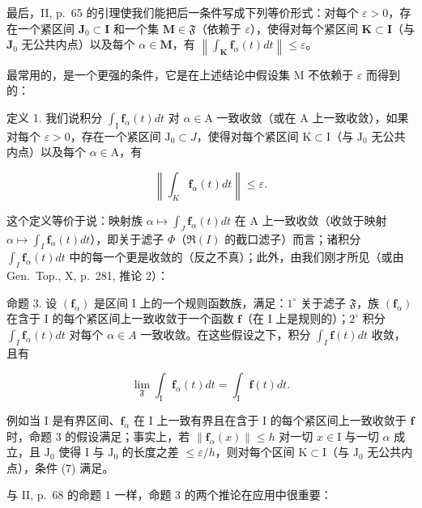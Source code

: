 最后，II, p.~65 的引理使我们能把后一条件写成下列等价形式：对每个 \(\varepsilon > 0\)，存在一个紧区间 \(\mathbf{J}_0 \subset \mathbf{I}\) 和一个集 \(\mathbf{M} \in \mathfrak{F}\)（依赖于 \(\varepsilon\)），使得对每个紧区间 \(\mathbf{K} \subset \mathbf{I}\)（与 \(\mathbf{J}_0\) 无公共内点）以及每个 \(\alpha \in \mathbf{M}\)，有 \(\left\| \int_{\mathbf{K}} \mathbf{f}_{\alpha}(t) dt \right\| \leqslant \varepsilon\)。

最常用的，是一个更强的条件，它是在上述结论中假设集 M 不依赖于 \(\varepsilon\) 而得到的：

定义 1. 我们说积分 \(\int_{\mathrm{I}} \mathbf{f}_{\alpha}(t) dt\) 对 \(\alpha \in \mathrm{A}\) 一致收敛（或在 \(\mathrm{A}\) 上一致收敛），如果对每个 \(\varepsilon > 0\)，存在一个紧区间 \(\mathrm{J}_0 \subset J\)，使得对每个紧区间 \(\mathrm{K} \subset \mathrm{I}\)（与 \(\mathrm{J}_0\) 无公共内点）以及每个 \(\alpha \in \mathrm{A}\)，有

\[
\left\| \int_ {K} \mathbf {f} _ {\alpha} (t) d t \right\| \leqslant \varepsilon .\tag{7}
\]

这个定义等价于说：映射族 \(\alpha\mapsto\int_{J}\mathbf{f}_{\alpha}(t)dt\) 在 A 上一致收敛（收敛于映射 \(\alpha\mapsto\int_{I}\mathbf{f}_{\alpha}(t)dt\)），即关于滤子 \(\Phi\)（\(\Re(I)\) 的截口滤子）而言；诸积分 \(\int_{I}\mathbf{f}_{\alpha}(t)dt\) 中的每一个更是收敛的（反之不真）；此外，由我们刚才所见（或由 Gen.~Top., X, p.~281, 推论 2）：

命题 3. 设 \((\mathbf{f}_{\alpha})\) 是区间 I 上的一个规则函数族，满足：\(1^{\circ}\) 关于滤子 \(\mathfrak{F}\)，族 \((\mathbf{f}_{\alpha})\) 在含于 I 的每个紧区间上一致收敛于一个函数 \(\mathbf{f}\)（在 I 上是规则的）；\(2^{\circ}\) 积分 \(\int_{I} \mathbf{f}_{\alpha}(t) dt\) 对每个 \(\alpha \in A\) 一致收敛。在这些假设之下，积分 \(\int_{I} \mathbf{f}(t) dt\) 收敛，且有

\[
\lim _ {\mathfrak {F}} \int_ {\mathrm{I}} \mathbf {f} _ {\alpha} (t) d t = \int_ {\mathrm{I}} \mathbf {f} (t) d t.\tag{8}
\]

例如当 I 是有界区间、\(\mathbf{f}_{\alpha}\) 在 I 上一致有界且在含于 I 的每个紧区间上一致收敛于 \(\mathbf{f}\) 时，命题 3 的假设满足；事实上，若 \(\| \mathbf{f}_{\alpha}(x)\| \leqslant h\) 对一切 \(x\in \mathrm{I}\) 与一切 \(\alpha\) 成立，且 \(\mathrm{J}_0\) 使得 I 与 \(\mathrm{J}_0\) 的长度之差 \(\leqslant \varepsilon /h\)，则对每个区间 \(\mathrm{K}\subset \mathrm{I}\)（与 \(\mathrm{J}_0\) 无公共内点），条件 (7) 满足。

与 II, p.~68 的命题 1 一样，命题 3 的两个推论在应用中很重要：


